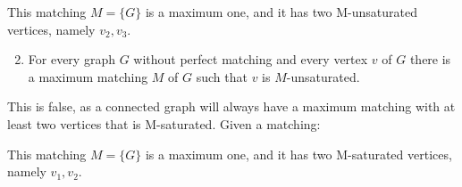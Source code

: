 \documentclass[a4paper]{article}
\begin{document}
\begin{enumerate}
\begin{center}
\end{center}

This matching $M = \{G\}$ is a maximum one, and it has two M-unsaturated vertices, namely $v_2, v_3$.
  
  \begin{enumerate}
    \setcounter{enumii}{1}
  \item For every graph $G$ without perfect matching and every vertex $v$ of
        $G$ there is a maximum matching $M$ of $G$ such that $v$ is
        $M$-unsaturated.
  \end{enumerate}
  This is false, as a connected graph will always have a maximum matching with at least two vertices that is M-saturated. Given a matching: \\
  \begin{center}
\end{center}

This matching $M = \{G\}$ is a maximum one, and it has two M-saturated vertices, namely $v_1, v_2$.

\end{enumerate}
\end{document}
